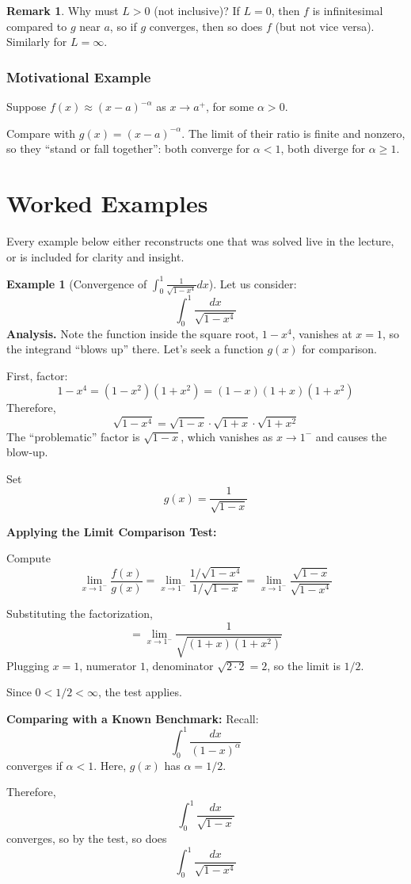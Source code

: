 \documentclass[12pt]{article}
\theoremstyle{definition}
\newtheorem{example}[theorem]{Example}
\newtheorem{remark}[theorem]{Remark}
\begin{document}
\begin{remark}
Why must $L > 0$ (not inclusive)? If $L = 0$, then $f$ is infinitesimal compared to $g$ near $a$, so if $g$ converges, then so does $f$ (but not vice versa). Similarly for $L = \infty$.
\end{remark}

\subsubsection*{Motivational Example}

Suppose $f(x) \approx (x - a)^{-\alpha}$ as $x \to a^+$, for some $\alpha > 0$.

Compare with $g(x) = (x - a)^{-\alpha}$. The limit of their ratio is finite and nonzero, so they ``stand or fall together'': both converge for $\alpha < 1$, both diverge for $\alpha \geq 1$.

\vspace{0.3cm}

\section{Worked Examples}

Every example below either reconstructs one that was solved live in the lecture, or is included for clarity and insight.

\begin{example}[Convergence of $\int_0^1 \frac{1}{\sqrt{1 - x^4}} dx$]
Let us consider:
\[
\int_0^1 \frac{dx}{\sqrt{1 - x^4}}
\]
\textbf{Analysis.} Note the function inside the square root, $1 - x^4$, vanishes at $x = 1$, so the integrand ``blows up'' there. Let's seek a function $g(x)$ for comparison.

First, factor:
\[
1 - x^4 = (1 - x^2)(1 + x^2) = (1 - x)(1 + x)(1 + x^2)
\]
Therefore,
\[
\sqrt{1 - x^4} = \sqrt{1 - x} \cdot \sqrt{1 + x} \cdot \sqrt{1 + x^2}
\]
The ``problematic'' factor is $\sqrt{1 - x}$, which vanishes as $x \to 1^-$ and causes the blow-up.

Set
\[
g(x) = \frac{1}{\sqrt{1 - x}}
\]

\textbf{Applying the Limit Comparison Test:}

Compute
\[
\lim_{x \to 1^-} \frac{f(x)}{g(x)} = \lim_{x \to 1^-} \frac{1/\sqrt{1 - x^4}}{1/\sqrt{1 - x}} = \lim_{x \to 1^-} \frac{\sqrt{1 - x}}{\sqrt{1 - x^4}}
\]

Substituting the factorization,
\[
= \lim_{x \to 1^-} \frac{1}{\sqrt{(1 + x)(1 + x^2)} }
\]
Plugging $x = 1$, numerator $1$, denominator $\sqrt{2 \cdot 2} = 2$, so the limit is $1/2$.

Since $0 < 1/2 < \infty$, the test applies.

\null

\textbf{Comparing with a Known Benchmark:}
Recall:
\[
\int_0^1 \frac{dx}{(1-x)^{\alpha}}
\]
converges if $\alpha < 1$. Here, $g(x)$ has $\alpha = 1/2$.

Therefore,
\[
\int_0^1 \frac{dx}{\sqrt{1 - x}}
\]
converges, so by the test, so does 
\[
\int_0^1 \frac{dx}{\sqrt{1 - x^4}}
\]
\end{example}
\end{document}

